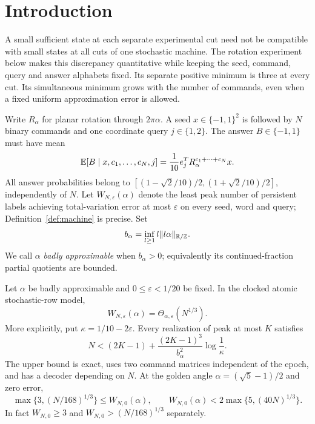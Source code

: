 \section{Introduction}
A small sufficient state at each separate experimental cut need not be
compatible with small states at all cuts of one stochastic machine.
The rotation experiment below makes this discrepancy quantitative while
keeping the seed, command, query and answer alphabets fixed. Its separate
positive minimum is three at every cut. Its simultaneous minimum grows
with the number of commands, even when a fixed uniform approximation
error is allowed.

Write $R_\alpha$ for planar rotation through $2\pi\alpha$. A seed
$x\in\{-1,1\}^2$ is followed by $N$ binary commands and one coordinate
query $j\in\{1,2\}$. The answer $B\in\{-1,1\}$ must have mean
\begin{equation}\label{eq:target}
 \mathbb E[B\mid x,c_1,\ldots,c_N,j]
       =\frac1{10}e_j^T R_\alpha^{c_1+\cdots+c_N}x.
\end{equation}
All answer probabilities belong to
$[(1-\sqrt2/10)/2,(1+\sqrt2/10)/2]$, independently of $N$.
Let $W_{N,\varepsilon}(\alpha)$ denote the least peak number of
persistent labels achieving total-variation error at most $\varepsilon$
on every seed, word and query; Definition~\ref{def:machine} is precise.
Set
\[
 b_\alpha=\inf_{l\ge1}l\|l\alpha\|_{\mathbb R/\mathbb Z}.
\]
We call $\alpha$ \emph{badly approximable} when $b_\alpha>0$;
equivalently its continued-fraction partial quotients are bounded.

\begin{theorem}\label{thm:main}
Let $\alpha$ be badly approximable and $0\le\varepsilon<1/20$ be fixed.
In the clocked atomic stochastic-row model,
\begin{equation}\label{eq:sharp}
                W_{N,\varepsilon}(\alpha)=\Theta_{\alpha,\varepsilon}(N^{1/3}).
\end{equation}
More explicitly, put $\kappa=1/10-2\varepsilon$. Every realization of
peak at most $K$ satisfies
\begin{equation}\label{eq:finite-main}
 N<(2K-1)+\frac{(2K-1)^3}{b_\alpha^2}\log\frac1\kappa.
\end{equation}
The upper bound is exact, uses two command matrices independent of the
epoch, and has a decoder depending on $N$. At the golden angle
$\alpha=(\sqrt5-1)/2$ and zero error,
\begin{equation}\label{eq:golden}
 \max\{3,(N/168)^{1/3}\}\le W_{N,0}(\alpha),
 \qquad
 W_{N,0}(\alpha)<2\max\{5,(40N)^{1/3}\}.
\end{equation}
In fact $W_{N,0}\ge3$ and $W_{N,0}>(N/168)^{1/3}$ separately.
\end{theorem}

